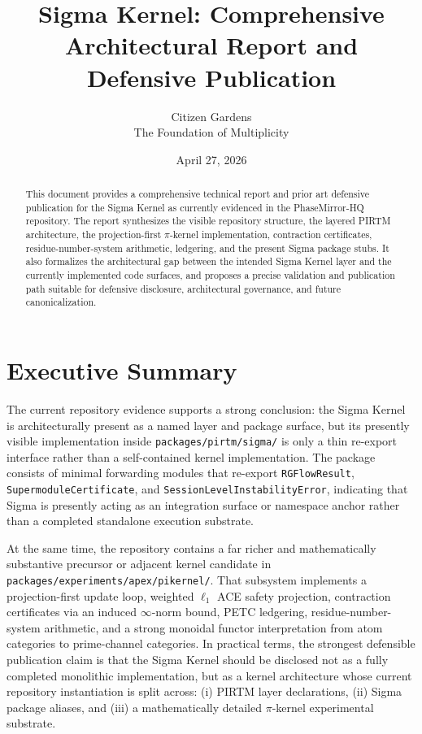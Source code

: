 \documentclass[11pt]{article}
\title{Sigma Kernel: Comprehensive Architectural Report and Defensive Publication}
\author{Citizen Gardens \\ The Foundation of Multiplicity}
\date{April 27, 2026}
\begin{document}
\maketitle
\begin{abstract}
This document provides a comprehensive technical report and prior art defensive publication for the Sigma Kernel as currently evidenced in the PhaseMirror-HQ repository. The report synthesizes the visible repository structure, the layered PIRTM architecture, the projection-first $\pi$-kernel implementation, contraction certificates, residue-number-system arithmetic, ledgering, and the present Sigma package stubs. It also formalizes the architectural gap between the intended Sigma Kernel layer and the currently implemented code surfaces, and proposes a precise validation and publication path suitable for defensive disclosure, architectural governance, and future canonicalization.
\end{abstract}
\newpage
\tableofcontents
\newpage

\section{Executive Summary}
The current repository evidence supports a strong conclusion: the Sigma Kernel is architecturally present as a named layer and package surface, but its presently visible implementation inside \texttt{packages/pirtm/sigma/} is only a thin re-export interface rather than a self-contained kernel implementation. The package consists of minimal forwarding modules that re-export \texttt{RGFlowResult}, \texttt{SupermoduleCertificate}, and \texttt{SessionLevelInstabilityError}, indicating that Sigma is presently acting as an integration surface or namespace anchor rather than a completed standalone execution substrate.

At the same time, the repository contains a far richer and mathematically substantive precursor or adjacent kernel candidate in \texttt{packages/experiments/apex/pikernel/}. That subsystem implements a projection-first update loop, weighted $\ell_1$ ACE safety projection, contraction certificates via an induced $\infty$-norm bound, PETC ledgering, residue-number-system arithmetic, and a strong monoidal functor interpretation from atom categories to prime-channel categories. In practical terms, the strongest defensible publication claim is that the Sigma Kernel should be disclosed not as a fully completed monolithic implementation, but as a kernel architecture whose current repository instantiation is split across: (i) PIRTM layer declarations, (ii) Sigma package aliases, and (iii) a mathematically detailed $\pi$-kernel experimental substrate.
\end{document}
